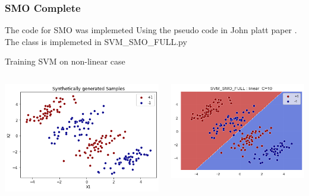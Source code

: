 \documentclass[12pt,t]{beamer}
\begin{document}
\begin{frame}
    \scriptsize
    \frametitle{SMO Complete}
    The code for SMO was implemeted Using the pseudo code in John platt paper .
    The class is implemeted in SVM\_SMO\_FULL.py
    \\

    \cite[Sequential Minimal Optimization:
    A Fast Algorithm for Training Support Vector Machines , John Platt]{}

    \large Training SVM on non-linear case 

    \begin{columns}[]
        \begin{column}[]{0.34\linewidth}
            \includegraphics[width=\linewidth]{images/p1c/data.png}
        \end{column}
        \begin{column}[]{0.34\linewidth}
            \includegraphics[width=\linewidth]{images/p1c/linear_results.png}

\end{column}
\end{columns}
\end{frame}
\end{document}
